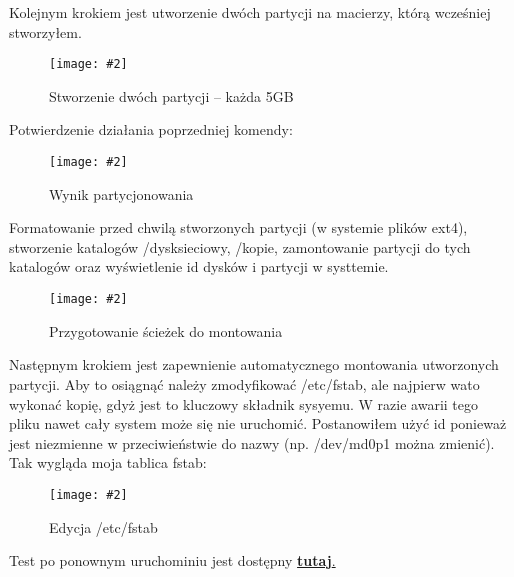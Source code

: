 \documentclass[a4paper]{article}
\newcommand*{\zdj}[2][\textwidth]{\texttt{[image: \#2]}}
\newcommand*{\fg}[4][!htb]{
      \begin{figure*}[#1]
            \zdj{#2}
            \caption[#4]{#3}
      \end{figure*}
}
\begin{document}
\newpage
Kolejnym krokiem jest utworzenie dwóch partycji na macierzy, którą wcześniej stworzyłem.
\fg{contents/configuration/Raid5/5.png}{Stworzenie dwóch partycji – każda 5GB}{Stworzenie dwóch partycji}

Potwierdzenie działania poprzedniej komendy: 
\fg{contents/configuration/Raid5/6.png}{Wynik partycjonowania}{Wynik partycjonowania}

\newpage
Formatowanie przed chwilą stworzonych partycji (w systemie plików ext4), stworzenie katalogów /dysksieciowy, /kopie, zamontowanie partycji do tych katalogów oraz wyświetlenie id dysków i partycji w systtemie.
\fg{contents/configuration/Raid5/7.png}{Przygotowanie ścieżek do montowania}{Przygotowanie ścieżek do montowania}

Następnym krokiem jest zapewnienie automatycznego montowania utworzonych partycji. Aby to osiągnąć należy zmodyfikować /etc/fstab, ale najpierw wato wykonać kopię, gdyż jest to kluczowy składnik sysyemu. W razie awarii tego pliku nawet cały system może się nie uruchomić. Postanowiłem użyć id ponieważ jest niezmienne w przeciwieństwie do nazwy (np. /dev/md0p1 można zmienić). Tak wygląda moja tablica fstab:
\fg{contents/configuration/Raid5/9.png}{Edycja /etc/fstab}{Edycja /etc/fstab}

Test po ponownym uruchominiu jest dostępny \hyperref[fig:raid5-auto-mount-test]{\textbf{tutaj}.}
\end{document}
